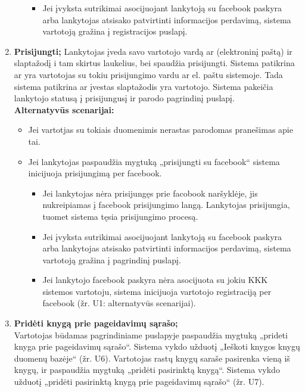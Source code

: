 \documentclass{VUMIFPSkursinis}
\begin{document}
\begin{enumerate}[label=\textbf{U\arabic*.}]
\begin{itemize}
\begin{itemize}
							\item Jei įvyksta sutrikimai asocijuojant lankytoją su facebook paskyra arba lankytojas atsisako patvirtinti informacijos perdavimą,
								sistema vartotoją gražina į registracijos puslapį.
						\end{itemize}
				\end{itemize}
			\item \textbf{Prisijungti;}
				Lankytojas įveda savo vartotojo vardą ar (elektroninį paštą) ir slaptažodį i tam skirtus laukelius, bei spaudžia prisijungti.
				Sistema patikrina ar yra vartotojas su tokiu prisijungimo vardu ar el. paštu sistemoje. 
				Tada sistema patikrina ar įvestas slaptažodis yra vartotojo. Sistema pakeičia lankytojo statusą į prisijungusį ir parodo pagrindinį puslapį.\\
				\textbf{Alternatyvūs scenarijai:}
				\begin{itemize}
					\item Jei vartotjas su tokiais duomenimis nerastas parodomas pranešimas apie tai.
					\item Jei lankytojas paspaudžia mygtuką „prisijungti su facebook“ sistema inicijuoja prisijungimą per facebook.
						\begin{itemize}
							\item Jei lankytojas nėra prisijungęs prie facobook naršyklėje, jis nukreipiamas į facebook prisijungimo langą. 
								Lankytojas prisijungia, tuomet sistema tęsia prisijungimo procesą.
							\item Jei įvyksta sutrikimai asocijuojant lankytoją su facebook paskyra arba lankytojas atsisako patvirtinti informacijos perdavimą,
								sistema vartotoją gražina į pagrindinį puslapį.
							\item Jei lankytojo facebook paskyra nėra asocijuota su jokiu KKK sistemos vartotoju, sistema inicijuoja vartotojo registraciją per facebook (žr. U1: alternatyvūs scenarijai).
						\end{itemize}
				\end{itemize}
			\item \textbf{Pridėti knygą prie pageidavimų sąrašo;} \\
				Vartotojas būdamas pagrindiniame puslapyje paspaudžia mygtuką „prideti knyga prie pageidavimų sąrašo“. 
				Sistema vykdo užduotį „Ieškoti knygos knygų duomenų bazėje“ (žr. U6).
				Vartotojas rastų knygų saraše pasirenka vieną iš knygų, ir paspaudžia mygtuką „pridėti pasirinktą knygą“.
				Sistema vykdo užduotį „pridėti pasirinktą knygą prie pageidavimų sąrašo“ (žr. U7).

\end{enumerate}
\end{document}
